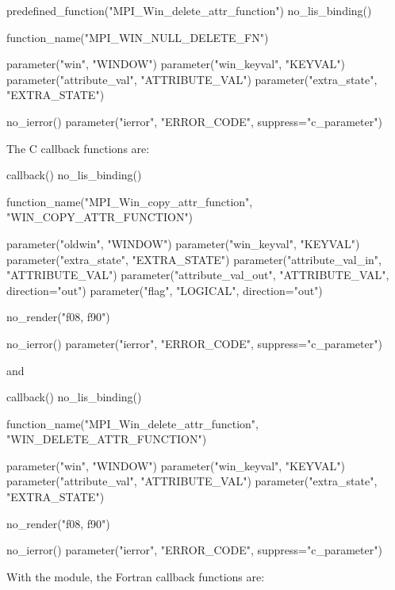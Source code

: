 \begin{mpi-binding}
    predefined_function("MPI_Win_delete_attr_function")
    no_lis_binding()
    
    function_name("MPI_WIN_NULL_DELETE_FN")
    
    parameter("win", "WINDOW")
    parameter("win_keyval", "KEYVAL")
    parameter("attribute_val", "ATTRIBUTE_VAL")
    parameter("extra_state", "EXTRA_STATE")
    
    no_ierror()
    parameter("ierror", "ERROR_CODE", suppress="c_parameter")
\end{mpi-binding}

\noindent
The C callback functions are:

%
\begin{mpi-binding}
    callback()
    no_lis_binding()
    
    function_name("MPI_Win_copy_attr_function", "WIN_COPY_ATTR_FUNCTION")
    
    parameter("oldwin", "WINDOW")
    parameter("win_keyval", "KEYVAL")
    parameter("extra_state", "EXTRA_STATE")
    parameter("attribute_val_in", "ATTRIBUTE_VAL")
    parameter("attribute_val_out", "ATTRIBUTE_VAL", direction="out")
    parameter("flag", "LOGICAL", direction="out")
    
    no_render("f08, f90")
    
    no_ierror()
    parameter("ierror", "ERROR_CODE", suppress="c_parameter")
\end{mpi-binding}

\noindent
and

%
\begin{mpi-binding}
    callback()
    no_lis_binding()
    
    function_name("MPI_Win_delete_attr_function", "WIN_DELETE_ATTR_FUNCTION")
    
    parameter("win", "WINDOW")
    parameter("win_keyval", "KEYVAL")
    parameter("attribute_val", "ATTRIBUTE_VAL")
    parameter("extra_state", "EXTRA_STATE")
    
    no_render("f08, f90")
    
    no_ierror()
    parameter("ierror", "ERROR_CODE", suppress="c_parameter")
\end{mpi-binding}


\noindent
With the  module, the Fortran callback functions are:

